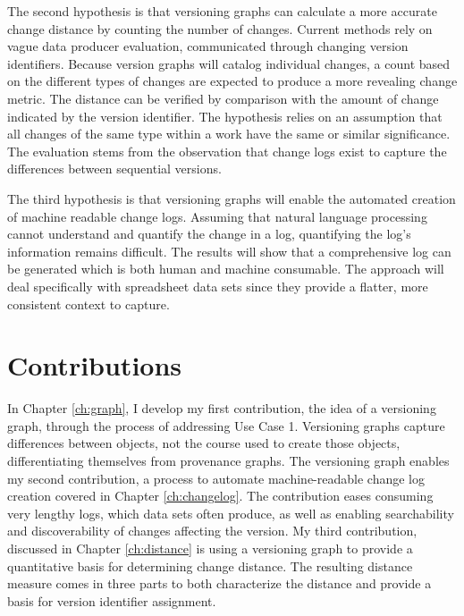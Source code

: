 The second hypothesis is that versioning graphs can calculate a more accurate change distance by counting the number of changes.
Current methods rely on vague data producer evaluation, communicated through changing version identifiers.
Because version graphs will catalog individual changes, a count based on the different types of changes are expected to produce a more revealing change metric.
The distance can be verified by comparison with the amount of change indicated by the version identifier.
The hypothesis relies on an assumption that all changes of the same type within a work have the same or similar significance.
The evaluation stems from the observation that change logs exist to capture the differences between sequential versions.

The third hypothesis is that versioning graphs will enable the automated creation of machine readable change logs.
Assuming that natural language processing cannot understand and quantify the change in a log, quantifying the log's information remains difficult.
The results will show that a comprehensive log can be generated which is both human and machine consumable.
The approach will deal specifically with spreadsheet data sets since they provide a flatter, more consistent context to capture.

\section{Contributions}


In Chapter \ref{ch:graph}, I develop my first contribution, the idea of a versioning graph, through the process of addressing Use Case 1.
Versioning graphs capture differences between objects, not the course used to create those objects, differentiating themselves from provenance graphs.
The versioning graph enables my second contribution, a process to automate machine-readable change log creation covered in Chapter \ref{ch:changelog}.
The contribution eases consuming very lengthy logs, which data sets often produce, as well as enabling searchability and discoverability of changes affecting the version.
My third contribution, discussed in Chapter \ref{ch:distance} is using a versioning graph to provide a quantitative basis for determining change distance.
The resulting distance measure comes in three parts to both characterize the distance and provide a basis for version identifier assignment.

